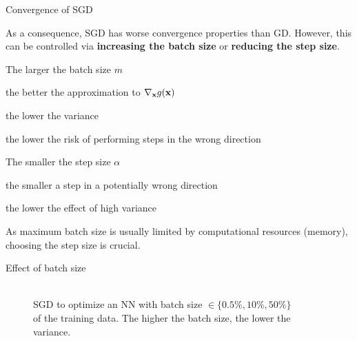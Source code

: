 \documentclass[11pt,compress,t,notes=noshow, xcolor=table]{beamer}
\begin{document}
\begin{vbframe}{Convergence of SGD}

	As a consequence, SGD has worse convergence properties than GD. However, this can be controlled via \textbf{increasing the batch size} or \textbf{reducing the step size}. 

	\begin{blocki}{The larger the batch size $m$}
		\item the better the approximation to $\nabla_{\mathbf{x}} g(\mathbf{x})$
		\item the lower the variance
		\item the lower the risk of performing steps in the wrong direction
	\end{blocki}

	\begin{blocki}{The smaller the step size $\alpha$}
		\item the smaller a step in a potentially wrong direction 
		\item the lower the effect of high variance
	\end{blocki}


As maximum batch size is usually limited by computational resources (memory), choosing the step size is crucial. 

\end{vbframe}

\begin{vbframe}{Effect of batch size}

\begin{figure}
     \\
    SGD to optimize an NN with batch size $\in \{0.5 \%, 10 \%, 50 \%\}$ \\ of the training data. 
    The higher the batch size, the lower the variance. 
\end{figure} 

\end{vbframe}


\endlecture
\end{document}
